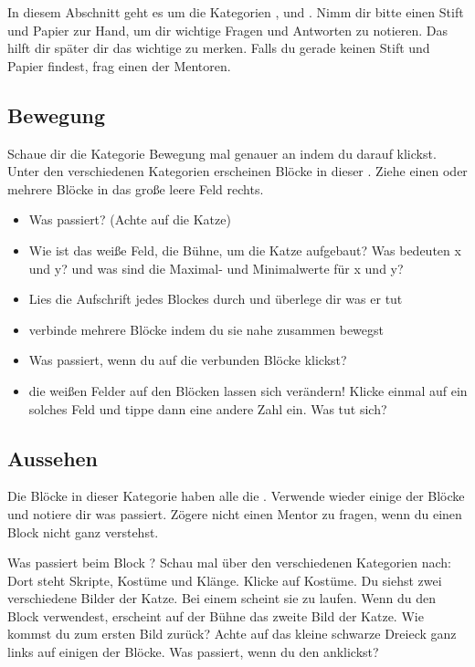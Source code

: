 \documentclass{\VorlagenPfad/coderdojokatext}
\begin{document}
In diesem Abschnitt geht es um die Kategorien \KBew, \KAus und \KEre. Nimm dir bitte einen Stift und Papier zur Hand, um dir wichtige Fragen und Antworten zu notieren. Das hilft dir später dir das wichtige zu merken. Falls du gerade keinen Stift und Papier findest, frag einen der Mentoren.

\subsection{Bewegung}
Schaue dir die Kategorie Bewegung mal genauer an indem du darauf klickst. Unter den verschiedenen Kategorien erscheinen Blöcke in dieser .
Ziehe einen oder mehrere Blöcke in das große leere Feld rechts.
\begin{itemize}
\item Was passiert? (Achte auf die Katze)
\item Wie ist das weiße Feld, die Bühne, um die Katze aufgebaut? Was bedeuten x und y? und was sind die Maximal- und Minimalwerte für x und y?
\item Lies die Aufschrift jedes Blockes durch und überlege dir was er tut
\item verbinde mehrere Blöcke indem du sie nahe zusammen bewegst
\item Was passiert, wenn du auf die verbunden Blöcke klickst?
\item die weißen Felder auf den Blöcken lassen sich verändern! Klicke einmal auf ein solches Feld und tippe dann eine andere Zahl ein. Was tut sich?
\end{itemize}

\subsection{Aussehen}
Die Blöcke in dieser Kategorie haben alle die . 
Verwende wieder einige der Blöcke und notiere dir was passiert. Zögere nicht einen Mentor zu fragen, wenn du einen Block nicht ganz verstehst.

Was passiert beim Block ? Schau mal über den verschiedenen Kategorien nach: Dort steht Skripte, Kostüme und Klänge. Klicke auf Kostüme. Du siehst zwei verschiedene Bilder der Katze. Bei einem scheint sie zu laufen. Wenn du den Block  verwendest, erscheint auf der Bühne das zweite Bild der Katze. Wie kommst du zum ersten Bild zurück? Achte auf das kleine schwarze Dreieck ganz links auf einigen der Blöcke. Was passiert, wenn du den anklickst?
\end{document}
